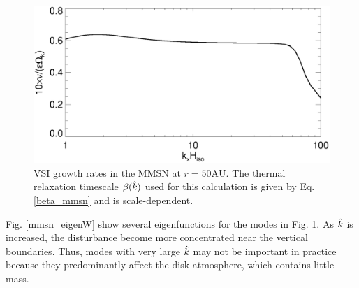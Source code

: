 \begin{figure}
  \includegraphics[width=\linewidth,clip=true,trim=0cm 0cm 0cm
  0cm]{figures/growth_mmsn_50AU} 
  \caption{VSI growth rates in the MMSN at
    $r=50\mathrm{AU}$. The thermal relaxation timescale $\beta(\hat{k})$
    used for this calculation is given by
    Eq. \ref{beta_mmsn} and is scale-dependent. 
    \label{mmsn_growth}}  
\end{figure}

Fig. \ref{mmsn_eigenW} show several eigenfunctions for the modes in
Fig. \ref{mmsn_growth}. As $\hat{k}$ is increased, the disturbance
become more concentrated near the vertical boundaries. Thus, modes
with very large $\hat{k}$ may not be important in practice because they
predominantly affect the disk atmosphere, which contains little mass.  

